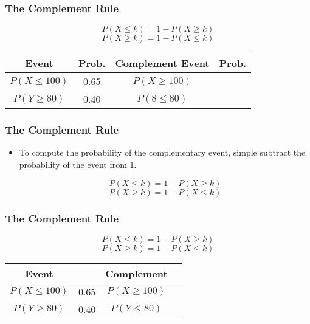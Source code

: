 \documentclass{beamer}
\begin{document}
\begin{frame}
\frametitle{The Complement Rule}
\Large
\vspace{-2cm}
\[P(X \leq k) = 1- P(X \geq k) \]
\[P(X \geq k) = 1- P(X \leq k) \]
\begin{tabular}{|c|c|c|c|}
\hline Event &\phantom{s} Prob.\phantom{s} & Complement Event & \phantom{s} Prob.\phantom{s}\\ 
\hline $P(X \leq 100)$ & 0.65 &$P(X \geq 100)$  &  \\ 
\hline $P(Y \geq 80)$ & 0.40 & $P(8 \leq 80)$ &  \\ 
\hline 
\end{tabular} 

\end{frame}
\begin{frame}
\frametitle{The Complement Rule}
\Large
\vspace{-2cm}\begin{itemize}

\item To compute the probability of the complementary event, simple subtract the probability of the event from 1.

\[P(X \leq k) = 1- P(X \geq k) \]
\[P(X \geq k) = 1- P(X \leq k) \]
\end{itemize}
\end{frame}
\begin{frame}
\frametitle{The Complement Rule}
\Large
\begin{center}
\vspace{-2cm}
\[P(X \leq k) = 1- P(X \geq k) \]
\[P(X \geq k) = 1- P(X \leq k) \]
\begin{tabular}{|c|c|c|c|}
\hline Event &  & Complement  & \phantom{Event} \\ 
\hline $P(X \leq 100)$ & 0.65 &$P(X \geq 100)$  &  \\ 
\hline $P(Y \geq 80)$ & 0.40 & $P(Y \leq 80)$ &  \\ 
\hline 
\end{tabular} 
\end{center}
\end{frame}
\begin{frame}


\end{frame}
\end{document}
